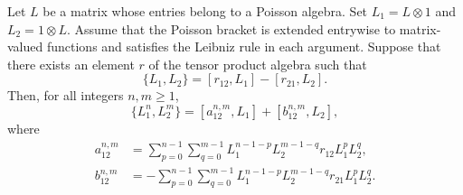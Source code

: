 \begin{proposition}\label{prop:fund}
     Let $L$ be a matrix whose entries belong to a Poisson algebra.
    Set $L_1 = L \otimes 1$ and $L_2 = 1 \otimes L$.
    Assume that the Poisson bracket is extended entrywise to matrix-valued functions and satisfies the Leibniz rule in each argument.
    Suppose that there exists an element $r$ of the tensor product algebra such that
    \begin{equation}\label{eq:fund}
        \{L_1,L_2\} = [r_{12},L_1] - [r_{21},L_2].
    \end{equation}
    Then, for all integers $n, m \ge 1$,
    \begin{equation}\label{eq:claim}
        \{L_1^n, L_2^m\} = [a_{12}^{n,m}, L_1] + [b_{12}^{n,m}, L_2],
    \end{equation}
    where
    \begin{align}
        a_{12}^{n,m} &=\sum_{p=0}^{n-1}\sum_{q=0}^{m-1} L_1^{n-1-p}L_2^{m-1-q}r_{12}L_1^{p}L_2^{q}, \\
        b_{12}^{n,m} &=-\sum_{p=0}^{n-1}\sum_{q=0}^{m-1} L_1^{n-1-p}L_2^{m-1-q}r_{21}L_1^{p}L_2^{q}.
    \end{align}
\end{proposition}
